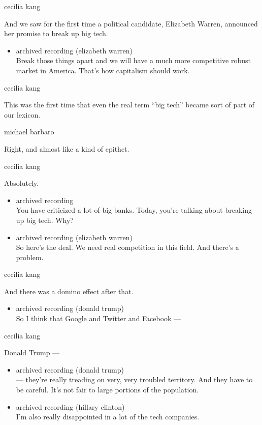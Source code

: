 cecilia kang

And we saw for the first time a political candidate, Elizabeth Warren,
announced her promise to break up big tech.

\begin{itemize}
\tightlist
\item
  archived recording (elizabeth warren)\\
  Break those things apart and we will have a much more competitive
  robust market in America. That's how capitalism should work.
\end{itemize}

cecilia kang

This was the first time that even the real term ``big tech'' became sort
of part of our lexicon.

michael barbaro

Right, and almost like a kind of epithet.

cecilia kang

Absolutely.

\begin{itemize}
\item
  archived recording\\
  You have criticized a lot of big banks. Today, you're talking about
  breaking up big tech. Why?
\item
  archived recording (elizabeth warren)\\
  So here's the deal. We need real competition in this field. And
  there's a problem.
\end{itemize}

cecilia kang

And there was a domino effect after that.

\begin{itemize}
\tightlist
\item
  archived recording (donald trump)\\
  So I think that Google and Twitter and Facebook ---
\end{itemize}

cecilia kang

Donald Trump ---

\begin{itemize}
\item
  archived recording (donald trump)\\
  --- they're really treading on very, very troubled territory. And they
  have to be careful. It's not fair to large portions of the population.
\item
  archived recording (hillary clinton)\\
  I'm also really disappointed in a lot of the tech companies.
\end{itemize}

